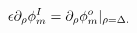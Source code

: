 \begin{equation}
\label{BC}
 \epsilon \partial_\rho \phi_m^I = 
\partial_\rho \phi_m^o \arrowvert_{ \rho=\Delta.}
\end{equation}

